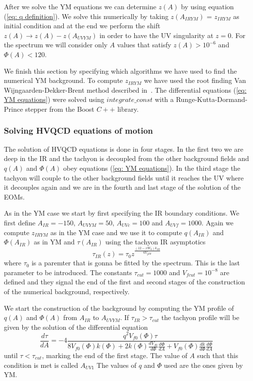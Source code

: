 \documentclass[a4paper,12pt]{article}
\begin{document}
After we solve the YM equations we can determine $z\left(A\right)$ by using equation (\ref{eq: q definition}). We solve this numerically by taking $z(A_{IRYM})$ = $z_{IRYM}$ as initial condition and at the end we perform the shift $z\left(A\right) \to z\left(A\right) - z\left(A_{UVYM} \right) $ in order to have the UV singularity at $z = 0$. For the spectrum we will consider only  $A$ values that satisfy $z\left(A\right) > 10^{-6}$ and $\Phi\left(A\right) < 120$.

We finish this section by specifying which algorithms we have used to find the numerical YM background. To compute $z_{IRYM}$ we have used the root finding Van Wijngaarden-Dekker-Brent method described in~\cite{10.5555/1403886}. The differential equations (\ref{eq: YM equations}) were solved using $integrate\_const$ with a Runge-Kutta-Dormand-Prince stepper from the Boost $C++$ library.

\subsubsection{Solving HVQCD equations of motion}

The solution of HVQCD equations is done in four stages. In the first two we are deep in the IR and the tachyon is decoupled from the other background fields and $q\left(A\right)$ and $\Phi\left(A\right)$ obey equations (\ref{eq: YM equations}). In the third stage the tachyon will couple to the other background fields until it reaches the UV where it decouples again and we are in the fourth and last stage of the solution of the EOMs.

As in the YM case we start by first specifying the IR boundary conditions. We first define $A_{IR} = -150$, $A_{UVYM} = 50$, $A_{UVc} = 100$ and $A_{UVf} = 1000$.
Again  we compute $z_{IRYM}$ as in the YM case and we use it to compute $q\left(A_{IR}\right)$ and $\Phi\left(A_{IR}\right)$ as in YM and $\tau\left(A_{IR}\right)$ using the tachyon IR asymptotics
\begin{equation}
\tau_{IR} \left(z \right) = \tau_0 z^{\frac{(12 - x W_0) k_{IR}}{6 V_{gIR}}}
\end{equation}
where $\tau_0$ is a paremter that is gonna be fitted by the spectrum. This is the last parameter to be introduced.
The constants $\tau_{cut} = 1000$ and $V_{f cut} = 10^{-8}$ are defined and they signal the end of the first and second stages of the construction of the numerical background, respectively.

We start the construction of the background by computing the YM profile of $q\left(A\right)$ and $\Phi\left(A\right)$ from $A_{IR}$ to $A_{UVYM}$. If $\tau_{IR} > \tau_{cut}$ the tachyon profile will be given by the solution of the differential equation
\begin{equation}
	\frac{d\tau}{dA} = - 4 \frac{q^2 V_{f0}\left(\Phi\right) \tau}{8 V_{f0}\left( \Phi\right) k\left(\Phi\right) + 2 k\left(\Phi\right) \frac{d V_{f0}}{d\Phi} \frac{d\Phi}{dA} + V_{f0} \left(\Phi\right) \frac{dk}{d\Phi} \frac{d\Phi}{dA} }
\end{equation}
until $\tau < \tau_{cut}$, marking the end of the first stage. The value of $A$ such that this condition is met is called $A_{UV1}$ The values of $q$ and $\Phi$ used are the ones given by YM.
\end{document}
